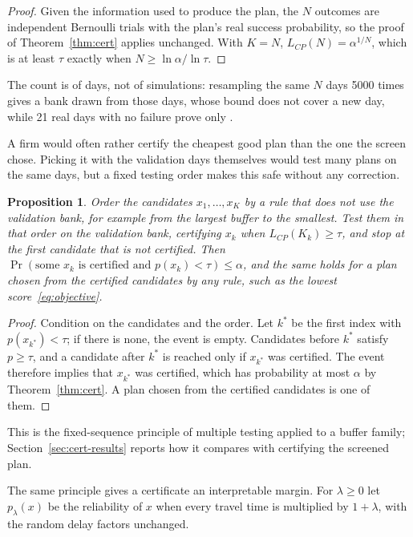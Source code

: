 \documentclass[11pt,a4paper]{article}
\newtheorem{proposition}{Proposition}
\theoremstyle{remark}
\begin{document}
\begin{proof}
Given the information used to produce the plan, the $N$ outcomes are independent
Bernoulli trials with the plan's real success probability, so the proof of
Theorem~\ref{thm:cert} applies unchanged. With $K=N$, $L_{CP}(N)=\alpha^{1/N}$,
which is at least $\tau$ exactly when $N\ge\ln\alpha/\ln\tau$.
\end{proof}

The count is of days, not of simulations: resampling the same $N$ days 5000 times
gives a bank drawn from those days, whose bound does not cover a new day, while 21
real days with no failure prove only \LfBoundTwentyOne.

A firm would often rather certify the cheapest good plan than the one the screen
chose. Picking it with the validation days themselves would test many plans on the
same days, but a fixed testing order makes this safe without any correction.

\begin{proposition}\label{prop:order}
Order the candidates $x_1,\ldots,x_K$ by a rule that does not use the validation
bank, for example from the largest buffer to the smallest. Test them in that order
on the validation bank, certifying $x_k$ when $L_{CP}(K_k)\ge\tau$, and stop at the
first candidate that is not certified. Then $\Pr(\text{some }x_k\text{ is certified
and }p(x_k)<\tau)\le\alpha$, and the same holds for a plan chosen from the certified
candidates by any rule, such as the lowest score~\eqref{eq:objective}.
\end{proposition}

\begin{proof}
Condition on the candidates and the order. Let $k^*$ be the first index with
$p(x_{k^*})<\tau$; if there is none, the event is empty. Candidates before $k^*$
satisfy $p\ge\tau$, and a candidate after $k^*$ is reached only if $x_{k^*}$ was
certified. The event therefore implies that $x_{k^*}$ was certified, which has
probability at most $\alpha$ by Theorem~\ref{thm:cert}. A plan chosen from the
certified candidates is one of them.
\end{proof}

This is the fixed-sequence principle of multiple testing
\citep{maurer1995} applied to a buffer family; Section~\ref{sec:cert-results} reports how it compares with certifying the
screened plan.

The same principle gives a certificate an interpretable margin. For $\lambda\ge0$ let
$p_\lambda(x)$ be the reliability of $x$ when every travel time is multiplied by
$1+\lambda$, with the random delay factors unchanged.
\end{document}
